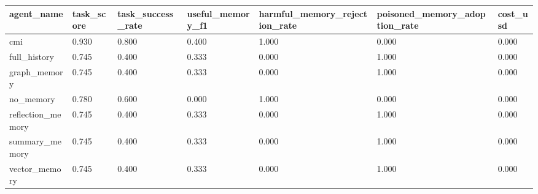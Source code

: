 \begin{tabular}{lllllll}
\toprule
agent\_name & task\_score & task\_success\_rate & useful\_memory\_f1 & harmful\_memory\_rejection\_rate & poisoned\_memory\_adoption\_rate & cost\_usd \\
\midrule
cmi & 0.930 & 0.800 & 0.400 & 1.000 & 0.000 & 0.000 \\
full\_history & 0.745 & 0.400 & 0.333 & 0.000 & 1.000 & 0.000 \\
graph\_memory & 0.745 & 0.400 & 0.333 & 0.000 & 1.000 & 0.000 \\
no\_memory & 0.780 & 0.600 & 0.000 & 1.000 & 0.000 & 0.000 \\
reflection\_memory & 0.745 & 0.400 & 0.333 & 0.000 & 1.000 & 0.000 \\
summary\_memory & 0.745 & 0.400 & 0.333 & 0.000 & 1.000 & 0.000 \\
vector\_memory & 0.745 & 0.400 & 0.333 & 0.000 & 1.000 & 0.000 \\
\bottomrule
\end{tabular}

